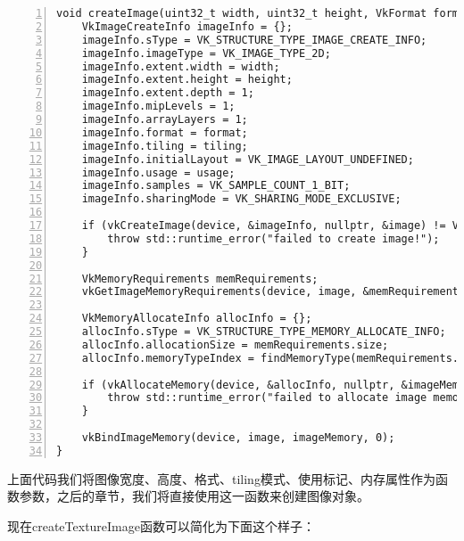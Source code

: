 \documentclass{ctexart}
\begin{document}
\begin{lstlisting}[language={[ANSI]C},keywordstyle=\color{blue!70},commentstyle=\color{red!50!green!50!blue!50},frame=shadowbox, rulesepcolor=\color{red!20!green!20!blue!20},basicstyle=\small,numbers=left, numberstyle=\tiny,breaklines=true]
void createImage(uint32_t width, uint32_t height, VkFormat format, VkImageTiling tiling, VkImageUsageFlags usage, VkMemoryPropertyFlags properties, VkImage& image, VkDeviceMemory& imageMemory) {
	VkImageCreateInfo imageInfo = {};
	imageInfo.sType = VK_STRUCTURE_TYPE_IMAGE_CREATE_INFO;
	imageInfo.imageType = VK_IMAGE_TYPE_2D;
	imageInfo.extent.width = width;
	imageInfo.extent.height = height;
	imageInfo.extent.depth = 1;
	imageInfo.mipLevels = 1;
	imageInfo.arrayLayers = 1;
	imageInfo.format = format;
	imageInfo.tiling = tiling;
	imageInfo.initialLayout = VK_IMAGE_LAYOUT_UNDEFINED;
	imageInfo.usage = usage;
	imageInfo.samples = VK_SAMPLE_COUNT_1_BIT;
	imageInfo.sharingMode = VK_SHARING_MODE_EXCLUSIVE;

	if (vkCreateImage(device, &imageInfo, nullptr, &image) != VK_SUCCESS) {
		throw std::runtime_error("failed to create image!");
	}

	VkMemoryRequirements memRequirements;
	vkGetImageMemoryRequirements(device, image, &memRequirements);

	VkMemoryAllocateInfo allocInfo = {};
	allocInfo.sType = VK_STRUCTURE_TYPE_MEMORY_ALLOCATE_INFO;
	allocInfo.allocationSize = memRequirements.size;
	allocInfo.memoryTypeIndex = findMemoryType(memRequirements.memoryTypeBits, properties);

	if (vkAllocateMemory(device, &allocInfo, nullptr, &imageMemory) != VK_SUCCESS) {
		throw std::runtime_error("failed to allocate image memory!");
	}

	vkBindImageMemory(device, image, imageMemory, 0);
}
\end{lstlisting}

上面代码我们将图像宽度、高度、格式、tiling模式、使用标记、内存属性作为函数参数，之后的章节，我们将直接使用这一函数来创建图像对象。

现在createTextureImage函数可以简化为下面这个样子：
\end{document}
